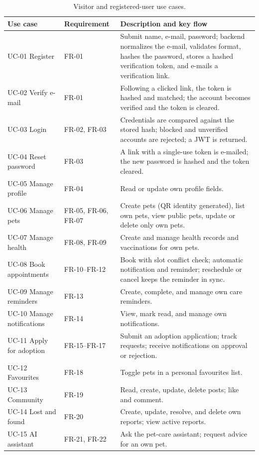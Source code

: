 \begin{center}
\begin{longtable}{@{}p{2.0cm}p{3.6cm}p{8.9cm}@{}}
\caption{Visitor and registered-user use cases.}
\label{tab:uc-user}\\
\toprule
\textbf{Use case} & \textbf{Requirement} & \textbf{Description and key flow} \\
\midrule
UC-01 Register & FR-01 & Submit name, e-mail, password; backend normalizes the
e-mail, validates format, hashes the password, stores a hashed verification
token, and e-mails a verification link. \\
UC-02 Verify e-mail & FR-01 & Following a clicked link, the token is hashed and
matched; the account becomes verified and the token is cleared. \\
UC-03 Login & FR-02, FR-03 & Credentials are compared against the stored hash;
blocked and unverified accounts are rejected; a JWT is returned. \\
UC-04 Reset password & FR-03 & A link with a single-use token is e-mailed; the
new password is hashed and the token cleared. \\
UC-05 Manage profile & FR-04 & Read or update own profile fields. \\
UC-06 Manage pets & FR-05, FR-06, FR-07 & Create pets (QR identity generated),
list own pets, view public pets, update or delete only own pets. \\
UC-07 Manage health & FR-08, FR-09 & Create and manage health records and
vaccinations for own pets. \\
UC-08 Book appointments & FR-10--FR-12 & Book with slot conflict check; automatic
notification and reminder; reschedule or cancel keeps the reminder in sync. \\
UC-09 Manage reminders & FR-13 & Create, complete, and manage own care reminders. \\
UC-10 Manage notifications & FR-14 & View, mark read, and manage own
notifications. \\
UC-11 Apply for adoption & FR-15--FR-17 & Submit an adoption application; track
requests; receive notifications on approval or rejection. \\
UC-12 Favourites & FR-18 & Toggle pets in a personal favourites list. \\
UC-13 Community & FR-19 & Read, create, update, delete posts; like and comment. \\
UC-14 Lost and found & FR-20 & Create, update, resolve, and delete own reports;
view active reports. \\
UC-15 AI assistant & FR-21, FR-22 & Ask the pet-care assistant; request advice
for an own pet. \\
\bottomrule
\end{longtable}
\end{center}

